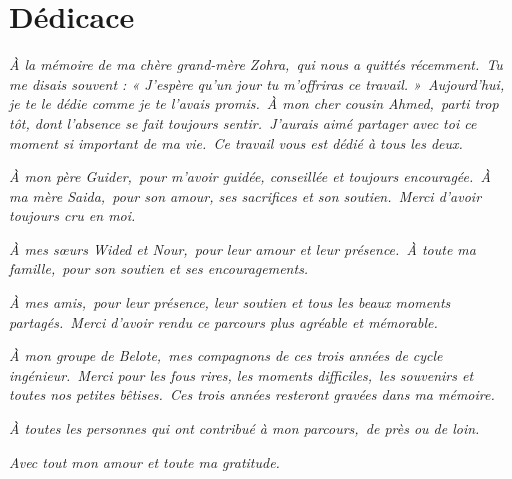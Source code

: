 \chapter*{Dédicace}

\begin{center}

\vspace{1cm}

\textit{
À la mémoire de ma chère grand-mère Zohra,\
qui nous a quittés récemment.\
Tu me disais souvent : « J'espère qu'un jour tu m'offriras ce travail. »\
Aujourd'hui, je te le dédie comme je te l'avais promis.\
À mon cher cousin Ahmed,\
parti trop tôt, dont l'absence se fait toujours sentir.\
J'aurais aimé partager avec toi ce moment si important de ma vie.\
Ce travail vous est dédié à tous les deux.
}

\vspace{0.7cm}

\textit{
À mon père Guider,\
pour m'avoir guidée, conseillée et toujours encouragée.\
À ma mère Saida,\
pour son amour, ses sacrifices et son soutien.\
Merci d'avoir toujours cru en moi.
}

\vspace{0.7cm}

\textit{
À mes sœurs Wided et Nour,\
pour leur amour et leur présence.\
À toute ma famille,\
pour son soutien et ses encouragements.
}

\vspace{0.7cm}

\textit{
À mes amis,\
pour leur présence, leur soutien et tous les beaux moments partagés.\
Merci d'avoir rendu ce parcours plus agréable et mémorable.
}

\vspace{0.7cm}

\textit{
À mon groupe de Belote,\
mes compagnons de ces trois années de cycle ingénieur.\
Merci pour les fous rires, les moments difficiles,\
les souvenirs et toutes nos petites bêtises.\
Ces trois années resteront gravées dans ma mémoire.
}

\vspace{0.8cm}

\textit{
À toutes les personnes qui ont contribué à mon parcours,\
de près ou de loin.
}

\vspace{0.8cm}

\textit{
Avec tout mon amour et toute ma gratitude.
}

\end{center}
